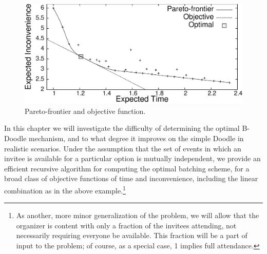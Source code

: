 \begin{figure}[h!] \small
\centering
\includegraphics[scale=0.45]{plots/pareto_objective_fin.eps}
\caption{Pareto-frontier and objective function.}
\label{bdoodle:fig:Pareto_objective}
\end{figure}

In this chapter we will investigate the difficulty of determining the
optimal B-Doodle mechanism, and to what degree it improves on the
simple Doodle in realistic scenarios.
Under the assumption that the set of events in which an invitee is available for a particular option is mutually independent, we provide an efficient recursive algorithm for computing the
optimal batching scheme, for a broad class of objective functions of
time and inconvenience, including the linear combination as in the
above example.\footnote{As another, more minor generalization of the
problem, we will allow that the organizer is content with only a
fraction of the invitees attending, not necessarily requiring everyone be
available. This fraction will be a part of input to the problem; of
course, as a special case, 1 implies full attendance.}

